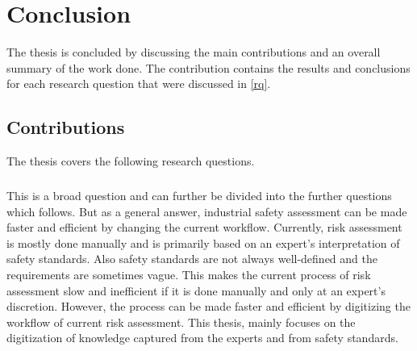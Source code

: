 \chapter{Conclusion} \label{conclusion}

\bigskip \bigskip The thesis is concluded by discussing the main contributions and an overall summary of the work done. The contribution contains the results and conclusions for each research question that were discussed in \ref{rq}.

\section{Contributions}

The thesis covers the following research questions.


\paragraph{} This is a broad question and can further be divided into the further questions which follows. But as a general answer, industrial safety assessment can be made faster and efficient by changing the current workflow. Currently, risk assessment is mostly done manually and is primarily based on an expert's interpretation of safety standards. Also safety standards are not always well-defined and the requirements are sometimes vague. This makes the current process of risk assessment slow and inefficient if it is done manually and only at an expert's discretion. However, the process can be made faster and efficient by digitizing the workflow of current risk assessment. This thesis, mainly focuses on the digitization of knowledge captured from the experts and from safety standards. 


